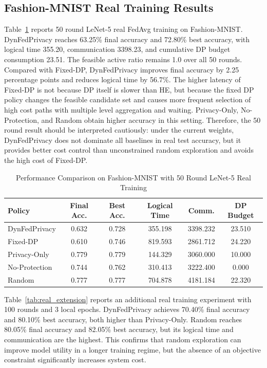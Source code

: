 ﻿\documentclass[preprint,12pt]{elsarticle}
\theoremstyle{plain}
\theoremstyle{definition}
\theoremstyle{remark}
\newcommand{\tabref}[1]{Table~\ref{#1}}
\newcommand{\method}{DynFedPrivacy}
\begin{document}
\subsection{Fashion-MNIST Real Training Results}
\label{sec:fmnist_results}
\tabref{tab:real_comparison} reports 50 round LeNet-5 real FedAvg training on Fashion-MNIST.
\method{} reaches 63.25\% final accuracy and 72.80\% best accuracy, with logical time 355.20, communication 3398.23, and cumulative DP budget consumption 23.51.
The feasible active ratio remains 1.0 over all 50 rounds.
Compared with Fixed-DP, \method{} improves final accuracy by 2.25 percentage points and reduces logical time by 56.7\%.
The higher latency of Fixed-DP is not because DP itself is slower than HE, but because the fixed DP policy changes the feasible candidate set and causes more frequent selection of high cost paths with multiple level aggregation and waiting.
Privacy-Only, No-Protection, and Random obtain higher accuracy in this setting.
Therefore, the 50 round result should be interpreted cautiously: under the current weights, \method{} does not dominate all baselines in real test accuracy, but it provides better cost control than unconstrained random exploration and avoids the high cost of Fixed-DP.

\begin{table}[t]
\centering
\caption{Performance Comparison on Fashion-MNIST with 50 Round LeNet-5 Real Training}
\label{tab:real_comparison}
\begin{tabular}{lccccc}
\hline
\textbf{Policy} & \textbf{Final Acc.} & \textbf{Best Acc.} & \textbf{Logical Time} & \textbf{Comm.} & \textbf{DP Budget} \\
\hline
\method{} & 0.632 & 0.728 & 355.198 & 3398.232 & 23.510 \\
Fixed-DP & 0.610 & 0.746 & 819.593 & 2861.712 & 24.220 \\
Privacy-Only & 0.779 & 0.779 & 144.329 & 3060.000 & 10.000 \\
No-Protection & 0.744 & 0.762 & 310.413 & 3222.400 & 0.000 \\
Random & 0.777 & 0.777 & 704.878 & 4181.184 & 22.320 \\
\hline
\end{tabular}
\end{table}

\tabref{tab:real_extension} reports an additional real training experiment with 100 rounds and 3 local epochs.
\method{} achieves 70.40\% final accuracy and 80.10\% best accuracy, both higher than Privacy-Only.
Random reaches 80.05\% final accuracy and 82.05\% best accuracy, but its logical time and communication are the highest.
This confirms that random exploration can improve model utility in a longer training regime, but the absence of an objective constraint significantly increases system cost.
\end{document}
